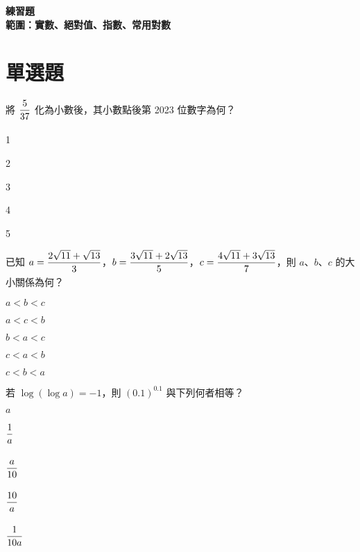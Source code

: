\documentclass[12pt]{article}
\newenvironment{choices}[1]{\par\NumTabs{#1}\begin{enumerate*}[label=(\Alph*),itemjoin=\tab]}{\end{enumerate*}}
\newcommand*{\fraction}[2]{\rule[-.8\baselineskip]{0pt}{2\baselineskip}\dfrac{#1}{#2}}
\renewcommand*{\maketitle}{{%
  \bfseries
  \LARGE 練習題 \\
  \large 範圍：實數、絕對值、指數、常用對數 \par
}}
\begin{document}
\maketitle
\section{單選題}
\begin{enumerate}[align=left,leftmargin=*,labelsep=.6em]
  \item 將 $\fraction{5}{37}$ 化為小數後，其小數點後第 2023 位數字為何？
  \begin{choices}{3}
    \item 1
    \item 2
    \item 3
    \item 4
    \item 5
  \end{choices}
  \item 已知 $a = \fraction{2\sqrt{11}+\sqrt{13}}{3}$，$b = \fraction{3\sqrt{11}+2\sqrt{13}}{5}$，$c = \fraction{4\sqrt{11}+3\sqrt{13}}{7}$，則 $a$、$b$、$c$ 的大小關係為何？
  \begin{choices}{3}
    \item $a < b < c$
    \item $a < c < b$
    \item $b < a < c$
    \item $c < a < b$
    \item $c < b < a$
  \end{choices}
  \item 若 $\log(\log a) = -1$，則 $(0.1)^{0.1}$ 與下列何者相等？
  \begin{choices}{3}
    \item $a$
    \item $\fraction{1}{a}$
    \item $\fraction{a}{10}$
    \item $\fraction{10}{a}$
    \item $\fraction{1}{10a}$
  \end{choices}
\end{enumerate}

\end{document}
